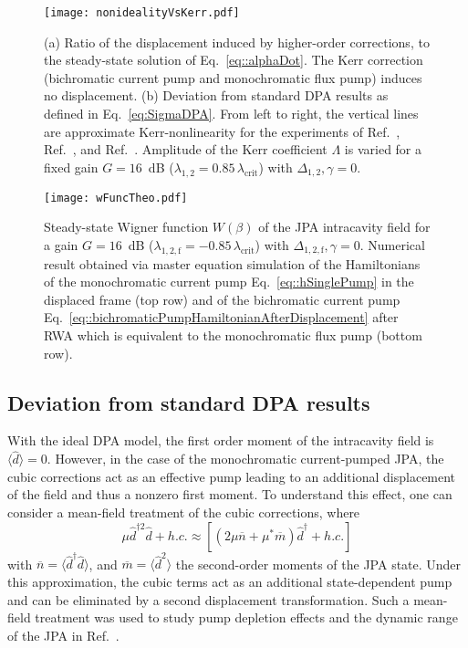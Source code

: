 \documentclass[pra,twocolumn,superscriptaddress]{revtex4-1}
\newcommand{\dhat}[0]{\hat{d}}
\newcommand{\lcrit}[0]{\lambda_{\mathrm{crit}}}
\newcommand{\parS}[1]{\left[#1\right]}
\newcommand{\parO}[1]{\left(#1\right)}
\begin{document}
 \begin{figure}[tb]
	\texttt{[image: nonidealityVsKerr.pdf]}
	\caption{
		(a) Ratio of the displacement induced by higher-order corrections, to the steady-state solution of Eq.~\eqref{eq::alphaDot}. The Kerr correction  (bichromatic current pump and monochromatic flux pump) induces no displacement.
		(b) Deviation from standard DPA results as defined in Eq.~\eqref{eq:SigmaDPA}. From left to right, the vertical lines are approximate Kerr-nonlinearity for the experiments of Ref.~\cite{Eichler:2013kx}, Ref.~\cite{Hatridge:2011qf}, and Ref.~\cite{Murch:2013kx}. 
		Amplitude of the Kerr coefficient $\Lambda$ is varied for a fixed gain $G=16$~dB ($\lambda_{1,2} = 0.85\,\lcrit$) with $\Delta_{1,2}, \gamma=0$.
	}
	\label{fig:pumpDepletion}
\end{figure}
% 
\begin{figure*}[tb]
	\texttt{[image: wFuncTheo.pdf]}
	\caption{
	Steady-state Wigner function $W(\beta)$ of the JPA intracavity field for a gain 
	$G=16$~dB 
	($\lambda_{1,2,\mathrm{f}} = -0.85\,\lcrit$) with $\Delta_{1,2,\mathrm{f}}, \gamma=0$.
	Numerical result obtained via master equation simulation of the Hamiltonians of the monochromatic current pump Eq.~\eqref{eq::hSinglePump} in the displaced frame (top row) and of the bichromatic current pump Eq.~\eqref{eq::bichromaticPumpHamiltonianAfterDisplacement} after RWA which is equivalent to the monochromatic flux pump
	(bottom row).
	\label{fig:intracavityWigner}
	}
\end{figure*}
% 
 
\subsection{Deviation from standard DPA results}
%
With the ideal DPA model, the first order moment of the intracavity field is $\langle \dhat \rangle =0$. However, in the case of the monochromatic current-pumped JPA, the cubic corrections act as an effective pump leading to an additional displacement of the field and thus a nonzero first moment.
To understand this effect, one can consider a mean-field treatment of the cubic corrections, where~\cite{Eichler:2013fk}
\begin{equation}
	\mu \dhat^{\dag 2 } \dhat + h.c.
	\approx
	  \parS{\parO{2 \mu   \overline{n} + \mu^* \overline{m} } \dhat^\dag    + h.c.}
\end{equation}
with $\overline{n} =\langle \dhat^{\dag} \dhat \rangle $, and $\overline{m} = \langle \dhat^2 \rangle$ the second-order moments of the JPA state. Under this approximation, the cubic terms act as an additional state-dependent pump and can be eliminated by a second displacement transformation.
Such a mean-field treatment was used to study pump depletion effects and the dynamic range of the JPA in Ref.~\cite{Eichler:2013fk}.
\end{document}
